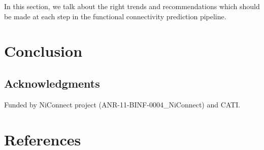 \documentclass[5p]{elsarticle}
\begin{document}
In this section, we talk about the right trends and recommendations which
should be made at each step in the functional connectivity prediction
pipeline.

\section{Conclusion}

\subsection*{Acknowledgments}

Funded by NiConnect project (ANR-11-BINF-0004\_NiConnect) and CATI.


\section{References}
\small
%

\end{document}
